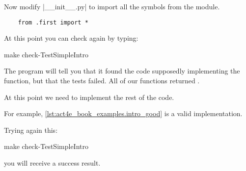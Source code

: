 Now modify \files|__init__.py| to import all the symbols from the  module.

\begin{verbatim}
    from .first import *
\end{verbatim}

At this point you can check again by typing:

\begin{console}
	make check-TestSimpleIntro
\end{console}

The program will tell you that it found the code supposedly implementing the function, but that the tests failed.
All of our functions returned .

At this point we need to implement the rest of the code.

For example, \cref{lst:act4e_book_examples.intro_good} is a valid implementation.

\begin{longcode}
	\caption{}
	\label{lst:act4e_book_examples.intro_good}
\end{longcode}

Trying again this:

\begin{console}
	make check-TestSimpleIntro
\end{console}

you will receive a success result.


